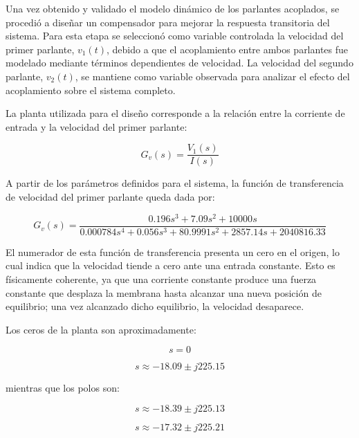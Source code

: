 \documentclass[journal]{IEEEtran}
\begin{document}
Una vez obtenido y validado el modelo dinámico de los parlantes acoplados, se procedió a diseñar un compensador para mejorar la respuesta transitoria del sistema. Para esta etapa se seleccionó como variable controlada la velocidad del primer parlante, $v_1(t)$, debido a que el acoplamiento entre ambos parlantes fue modelado mediante términos dependientes de velocidad. La velocidad del segundo parlante, $v_2(t)$, se mantiene como variable observada para analizar el efecto del acoplamiento sobre el sistema completo.

La planta utilizada para el diseño corresponde a la relación entre la corriente de entrada y la velocidad del primer parlante:

\begin{equation}
G_v(s)=\frac{V_1(s)}{I(s)}
\end{equation}

A partir de los parámetros definidos para el sistema, la función de transferencia de velocidad del primer parlante queda dada por:

\begin{equation}
G_v(s)=
\frac{0.196s^3+7.09s^2+10000s}
{0.000784s^4+0.056s^3+80.9991s^2+2857.14s+2040816.33}
\end{equation}

El numerador de esta función de transferencia presenta un cero en el origen, lo cual indica que la velocidad tiende a cero ante una entrada constante. Esto es físicamente coherente, ya que una corriente constante produce una fuerza constante que desplaza la membrana hasta alcanzar una nueva posición de equilibrio; una vez alcanzado dicho equilibrio, la velocidad desaparece.

Los ceros de la planta son aproximadamente:

\begin{equation}
s=0
\end{equation}

\begin{equation}
s \approx -18.09 \pm j225.15
\end{equation}

mientras que los polos son:

\begin{equation}
s \approx -18.39 \pm j225.13
\end{equation}

\begin{equation}
s \approx -17.32 \pm j225.21
\end{equation}
\end{document}

